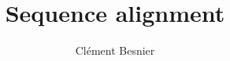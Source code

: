 \documentclass[11pt]{article}
\title{Sequence alignment}
\author{Clément Besnier}
\begin{document}
    \maketitle

    \section{}
\end{document}

